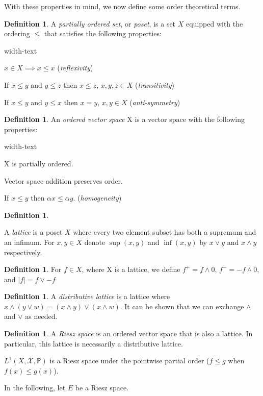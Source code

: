 \documentclass[letterpaper,10pt,oneside,onecolumn,reqno]{amsart}
\renewcommand{\P}{\mathbb P}
\newcommand{\X}{\mathcal X}
\theoremstyle{definition}
\newtheorem{defn}[thm]{Definition}
\newcommand{\meet}{\wedge}
\newcommand{\join}{\vee}
\begin{document}
With these properties in mind, we now define some order theoretical terms.

\begin{defn}\label{def:2}
A \emph{partially ordered set}, or \emph{poset}, is a set $X$ equipped with the ordering $\leq$ that satisfies the following properties:

\begin{deflist}{width-text}
\item $x \in X \implies x \leq x$ (\emph{reflexivity})
\item If $x \leq y$ and $y \leq z$ then $x \leq z$, $x,y,z \in X$ (\emph{transitivity})
\item If $x \leq y$ and $y \leq x$ then $x = y$, $x,y \in X$ (\emph{anti-symmetry})
\end{deflist}
\end{defn}

\begin{defn}\label{def:3}
An \emph{ordered vector space} X is a vector space with the following properties:

\begin{deflist}{width-text}
\item X is partially ordered.
\item Vector space addition preserves order.
\item If $x \leq y$ then $\alpha x \leq \alpha y$. (\emph{homogeneity})
\end{deflist}
\end{defn}

\begin{defn}\label{def:4}

A \emph{lattice} is a poset $X$ where every two element subset has both a supremum and an infimum. For $x, y \in X$ denote $\sup(x,y)$ and $\inf(x,y)$ by $x \join y$ and $x \meet y$ respectively. 
\end{defn}

\begin{defn}\label{def:5}
For $f \in X$, where X is a lattice, we define $f^+=f \meet 0$, $f^-=-f \meet 0$, and $|f| = f \join -f$
\end{defn}

\begin{defn}\label{def:6}
A \emph{distributive lattice} is a lattice where $x \meet (y \join w) = (x \meet y) \join (x \meet w)$. It can be shown that we can exchange $\meet$ and $\join$ as needed.
\end{defn}

\begin{defn}\label{def:7}
  A \emph{Riesz space} is an ordered vector space that is also a lattice. In particular, this lattice is necessarily a distributive lattice.

$L^1(X,\X,\P)$ is a Riesz space under the pointwise partial order ($f \leq g$ when $f(x) \leq g(x)$).

\end{defn}
In the following, let $E$ be a Riesz space.
\end{document}
